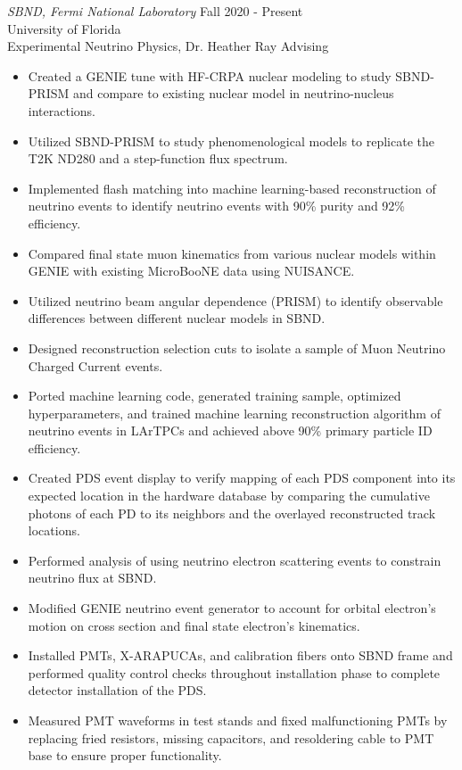 \documentclass[margin, 10pt]{res} %
\begin{document}
\begin{resume}
{\sl SBND, Fermi National Laboratory} \hfill Fall 2020 - Present \\
\hfill University of Florida \\
\hfill Experimental Neutrino Physics, Dr. Heather Ray Advising
\begin{itemize}
    \item Created a GENIE tune with HF-CRPA nuclear modeling to study SBND-PRISM and compare to existing nuclear model in neutrino-nucleus interactions.
    \item Utilized SBND-PRISM to study phenomenological models to replicate the T2K ND280 and a step-function flux spectrum.
    \item Implemented flash matching into machine learning-based reconstruction of neutrino events to identify neutrino events with 90\% purity and 92\% efficiency.
    \item  Compared final state muon kinematics from various nuclear models within GENIE with existing MicroBooNE data using NUISANCE.
    \item Utilized neutrino beam angular dependence (PRISM) to identify observable differences between different nuclear models in SBND.
    \item Designed reconstruction selection cuts to isolate a sample of Muon Neutrino Charged Current events.
    \item Ported machine learning code, generated training sample, optimized hyperparameters, and trained machine learning reconstruction algorithm of neutrino events in LArTPCs and achieved above 90\% primary particle ID efficiency.
    \item Created PDS event display to verify mapping of each PDS component into its expected location in the hardware database by comparing the cumulative photons of each PD to its neighbors and the overlayed reconstructed track locations.
    \item Performed analysis of using neutrino electron scattering events to constrain neutrino flux at SBND.
    \item Modified GENIE neutrino event generator to account for orbital electron's motion on cross section and final state electron's kinematics.
    \item Installed PMTs, X-ARAPUCAs, and calibration fibers onto SBND frame and performed quality control checks throughout installation phase to complete detector installation of the PDS.
    \item Measured PMT waveforms in test stands and fixed malfunctioning PMTs by replacing fried resistors, missing capacitors, and resoldering cable to PMT base to ensure proper functionality.
\end{itemize}


\end{resume}
\end{document}
